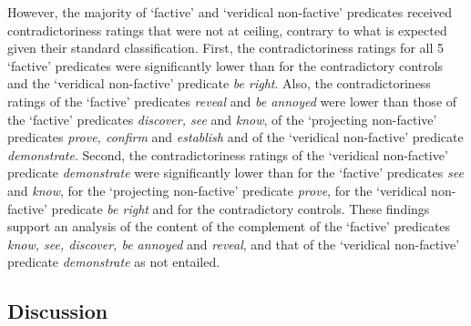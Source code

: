 \documentclass[11pt,fleqn]{article}
\newcommand{\6}{\mbox{$[\hspace*{-.6mm}[$}}
\newcommand{\9}{\mbox{$]\hspace*{-.6mm}]$}}
\begin{document}
{However, the majority of `factive' and `veridical non-factive' predicates received contradictoriness ratings that were not at ceiling, contrary to what is expected given their standard classification. First, the contradictoriness ratings for all 5 `factive' predicates were significantly lower than for the contradictory controls and the `veridical non-factive' predicate {\em be right}. Also, the contradictoriness ratings of the `factive' predicates {\em reveal} and {\em be annoyed} were lower than those of the `factive' predicates {\em discover, see} and {\em know}, of the `projecting non-factive' predicates {\em prove, confirm} and {\em establish} and of the `veridical non-factive' predicate {\em demonstrate}. Second, the contradictoriness ratings of the `veridical non-factive' predicate {\em demonstrate} were significantly lower than for the `factive' predicates {\em see} and {\em know}, for the `projecting non-factive' predicate {\em prove}, for the `veridical non-factive' predicate {\em be right} and for the contradictory controls. These findings support an analysis of the content of the complement of the `factive' predicates {\em know, see, discover, be annoyed} and {\em reveal}, and that of the `veridical non-factive' predicate {\em demonstrate} as not entailed.

\subsection{Discussion}\label{s33}

}
\end{document}

